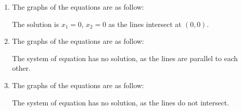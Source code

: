 \documentclass[../../../../Assignments]{subfiles}
\begin{document}
\begin{solution}
    \begin{enumerate}[label = \alph*)]
        \item The graphs of the equations are as follow:
            \begin{figure}[H]
                \centering
                \begingroup
                    
                \endgroup
            \end{figure}

            The solution is \(x_1 = 0\), \(x_2 = 0\) as the lines intersect at
            \((0, 0)\).

        \item The graphs of the equations are as follow:
            \begin{figure}[H]
                \centering
                \begingroup
                    
                \endgroup
            \end{figure}

            The system of equation has no solution, as the lines are parallel to
            each other.

        \item The graphs of the equations are as follow:
            \begin{figure}[H]
                \centering
                \begingroup
                    
                \endgroup
            \end{figure}

            The system of equation has no solution, as the lines do not
            intersect.
    \end{enumerate}
\end{solution}
\end{document}
